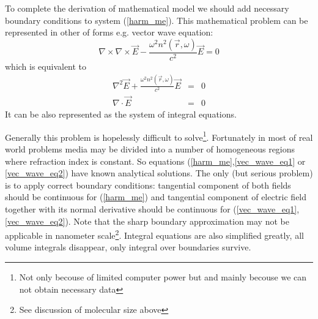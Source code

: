 \documentclass[12pt]{article}
\begin{document}
To complete the derivation of mathematical model we should add necessary boundary conditions to system (\ref{harm_me}). This mathematical problem can be represented in other of forms e.g. vector wave equation:
\begin{equation}
	\nabla \times \nabla \times  \vec E-\frac{\omega^2 n^2(\vec r,\omega)}{c^2} \vec E=0 \label{vec_wave_eq1}
\end{equation}
which is equivalent to
\begin{eqnarray}
	\nabla^2  \vec E+\frac{\omega^2 n^2(\vec r,\omega)}{c^2} \vec E&=&0 \nonumber \\
	\nabla \cdot \vec E &=&0 \label{vec_wave_eq2}
\end{eqnarray}
It can be also represented as the system of integral equations.

Generally this problem is hopelessly difficult to solve\footnote{Not only becouse of limited computer power but and mainly becouse we can not obtain necessary data}. Fortunately in most of real world problems media may be divided into a number of homogeneous regions where refraction index is constant. So equations (\ref{harm_me},\ref{vec_wave_eq1} or \ref{vec_wave_eq2}) have known analytical solutions. The only (but serious problem) is to apply correct boundary conditions: tangential component of both fields should be continuous for (\ref{harm_me}) and tangential component of electric field together with its normal derivative should be continuous for (\ref{vec_wave_eq1}, \ref{vec_wave_eq2}). Note that the sharp boundary approximation may not be applicable in nanometer scale\footnote {See discussion of molecular size above}. Integral equations are also simplified greatly, all volume integrals disappear, only integral over boundaries survive. 
\end{document}
